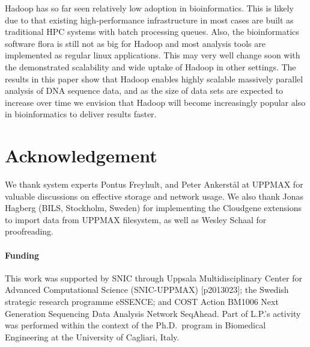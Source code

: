 \documentclass{bioinfo}
\begin{document}
Hadoop has so far seen relatively low adoption in bioinformatics. This is likely due to that existing high-performance infrastructure in most cases are built as traditional HPC systems with batch processing queues. Also, the bioinformatics software flora is still not as big for Hadoop and most analysis tools are implemented as regular linux applications. This may very well change soon with the demonstrated scalability and wide uptake of Hadoop in other settings. The results in this paper show that Hadoop enables highly scalable massively parallel analysis of DNA sequence data, and as the size of data sets are expected to increase over time we envision that Hadoop will become increasingly popular also in bioinformatics to deliver results faster.






%
%






\section*{Acknowledgement}
We thank system experts Pontus Freyhult, and Peter Ankerst{\aa}l at UPPMAX for valuable discussions on effective storage and network usage. We also thank Jonas Hagberg (BILS, Stockholm, Sweden) for implementing the Cloudgene extensions to import data from UPPMAX filesystem, as well as Wesley Schaal for proofreading.


\paragraph{Funding\textcolon} This work was supported by SNIC through Uppsala Multidisciplinary Center for Advanced Computational Science (SNIC-UPPMAX) [p2013023]; the Swedish strategic research programme eSSENCE; and COST Action BM1006 Next Generation Sequencing Data Analysis Network SeqAhead. Part of L.P.'s activity was performed within the context of the Ph.D.\ program in Biomedical Engineering at the University of Cagliari, Italy.\\




%
%
%
%
%
%
%
%


\end{document}
